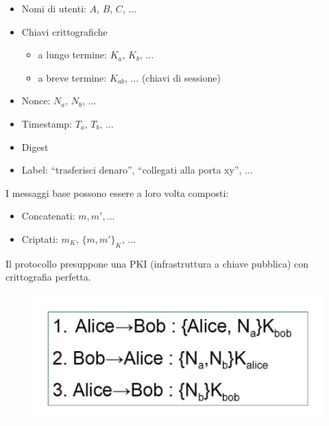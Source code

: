 \begin{itemize}
    \item Nomi di utenti: \(A\), \(B\), \(C\), \(\ldots \)
    \item Chiavi crittografiche
          \begin{itemize}
              \item a lungo termine: \(K_a\), \(K_b\), \(\ldots \)
              \item a breve termine: \(K_{ab}\),  \(\ldots \) (chiavi di sessione)
          \end{itemize}
    \item Nonce: \(N_a\), \(N_b\), \(\ldots \)
    \item Timestamp: \(T_a\), \(T_b\), \(\ldots \)
    \item Digest
    \item Label: “trasferisci denaro”, “collegati alla porta xy”, \(\ldots \)
\end{itemize}

I messaggi base possono essere a loro volta composti:
\begin{itemize}
    \item Concatenati: \(m, m', \ldots\)
    \item Criptati: \(m_K\), \(\{m,m'\}_K\), \(\ldots\)
\end{itemize}

Il protocollo presuppone una PKI (infrastruttura a chiave pubblica)
con crittografia perfetta.

\begin{figure}[H]
    \centering
    \includegraphics[width=\textwidth, keepaspectratio]{capitoli/crittografia/imgs/alieno.png}
\end{figure}

